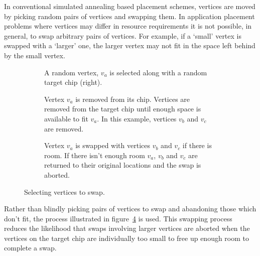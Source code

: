 				In conventional simulated annealing based placement schemes, vertices
				are moved by picking random pairs of vertices and swapping them. In
				application placement problems where vertices may differ in resource
				requirements it is not possible, in general, to swap arbitrary pairs of
				vertices. For example, if a `small' vertex is swapped with a `larger'
				one, the larger vertex may not fit in the space left behind by the
				small vertex.
				
				\begin{figure}
					\center
					\begin{subfigure}{\linewidth}
						\center
						\caption{A random vertex, $v_a$ is selected along with a random
						target chip (right).}
						\label{fig:sa-swap-select}
					\end{subfigure}
					
					\vspace*{1em}
					
					\begin{subfigure}{\linewidth}
						\center
						\caption{Vertex $v_a$ is removed from its chip. Vertices are removed
						from the target chip until enough space is available to fit $v_a$.
						In this example, vertices $v_b$ and $v_c$ are removed.}
						\label{fig:sa-swap-remove}
					\end{subfigure}
					
					\vspace*{1em}
					
					\begin{subfigure}{\linewidth}
						\center
						\caption{Vertex $v_a$ is swapped with vertices $v_b$ and $v_c$ if
						there is room. If there isn't enough room $v_a$, $v_b$ and $v_c$
						are returned to their original locations and the swap is aborted.}
						\label{fig:sa-swap-commit}
					\end{subfigure}
					
					\caption{Selecting vertices to swap.}
					\label{fig:sa-swap}
				\end{figure}
				
				Rather than blindly picking pairs of vertices to swap and abandoning
				those which don't fit, the process illustrated in
				figure~\ref{fig:sa-swap} is used. This swapping process reduces the
				likelihood that swaps involving larger vertices are aborted when the
				vertices on the target chip are individually too small to free up
				enough room to complete a swap.
			
